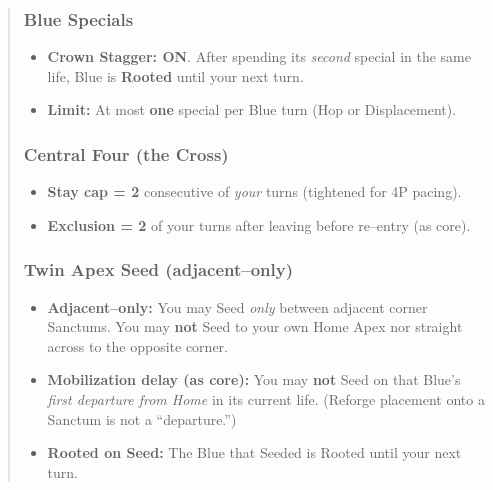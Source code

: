\documentclass[11pt]{article}
\begin{document}
\begin{quote}
\subsubsection*{Blue Specials}
\begin{itemize}[leftmargin=1.3em,itemsep=0.2em]
  \item \textbf{Crown Stagger: ON}. After spending its \emph{second} special in the same life, Blue is \textbf{Rooted} until your next turn.
  \item \textbf{Limit:} At most \textbf{one} special per Blue turn (Hop or Displacement).
\end{itemize}

\subsubsection*{Central Four (the Cross)}
\begin{itemize}[leftmargin=1.3em,itemsep=0.2em]
  \item \textbf{Stay cap = 2} consecutive of \emph{your} turns (tightened for 4P pacing).
  \item \textbf{Exclusion = 2} of your turns after leaving before re–entry (as core).
\end{itemize}

\subsubsection*{Twin Apex Seed (adjacent–only)}
\begin{itemize}[leftmargin=1.3em,itemsep=0.2em]
  \item \textbf{Adjacent–only:} You may Seed \emph{only} between adjacent corner Sanctums. You may \textbf{not} Seed to your own Home Apex nor straight across to the opposite corner.
  \item \textbf{Mobilization delay (as core):} You may \textbf{not} Seed on that Blue’s \emph{first departure from Home} in its current life. (Reforge placement onto a Sanctum is not a “departure.”)
  \item \textbf{Rooted on Seed:} The Blue that Seeded is Rooted until your next turn.
\end{itemize}


\end{quote}
\end{document}
